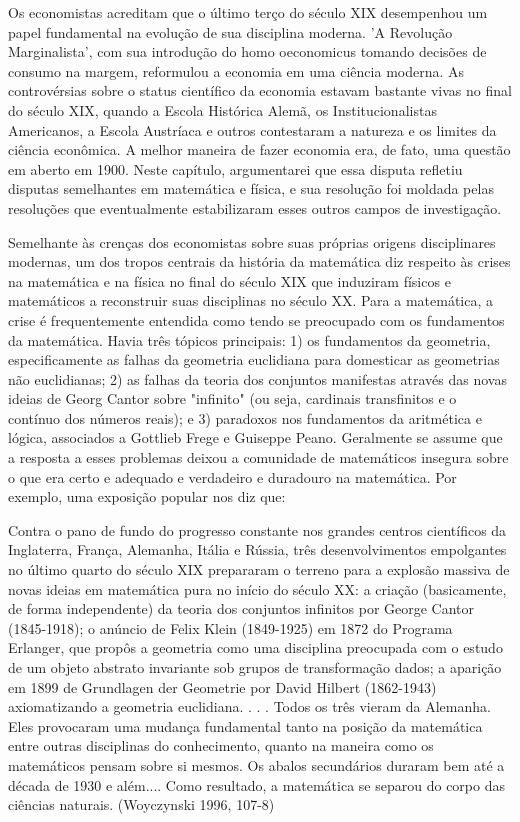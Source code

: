 \documentclass[12pt]{article}
\begin{document}
Os economistas acreditam que o último terço do século XIX desempenhou um papel fundamental na evolução de sua disciplina moderna. 'A Revolução Marginalista', com sua introdução do homo oeconomicus tomando decisões de consumo na margem, reformulou a economia em uma ciência moderna. As controvérsias sobre o status científico da economia estavam bastante vivas no final do século XIX, quando a Escola Histórica Alemã, os Institucionalistas Americanos, a Escola Austríaca e outros contestaram a natureza e os limites da ciência econômica. A melhor maneira de fazer economia era, de fato, uma questão em aberto em 1900. Neste capítulo, argumentarei que essa disputa refletiu disputas semelhantes em matemática e física, e sua resolução foi moldada pelas resoluções que eventualmente estabilizaram esses outros campos de investigação.

Semelhante às crenças dos economistas sobre suas próprias origens disciplinares modernas, um dos tropos centrais da história da matemática diz respeito às crises na matemática e na física no final do século XIX que induziram físicos e matemáticos a reconstruir suas disciplinas no século XX. Para a matemática, a crise é frequentemente entendida como tendo se preocupado com os fundamentos da matemática. Havia três tópicos principais: 1) os fundamentos da geometria, especificamente as falhas da geometria euclidiana para domesticar as geometrias não euclidianas; 2) as falhas da teoria dos conjuntos manifestas através das novas ideias de Georg Cantor sobre "infinito" (ou seja, cardinais transfinitos e o contínuo dos números reais); e 3) paradoxos nos fundamentos da aritmética e lógica, associados a Gottlieb Frege e Guiseppe Peano. Geralmente se assume que a resposta a esses problemas deixou a comunidade de matemáticos insegura sobre o que era certo e adequado e verdadeiro e duradouro na matemática. Por exemplo, uma exposição popular nos diz que:

Contra o pano de fundo do progresso constante nos grandes centros científicos da Inglaterra, França, Alemanha, Itália e Rússia, três desenvolvimentos empolgantes no último quarto do século XIX prepararam o terreno para a explosão massiva de novas ideias em matemática pura no início do século XX: a criação (basicamente, de forma independente) da teoria dos conjuntos infinitos por George Cantor (1845-1918); o anúncio de Felix Klein (1849-1925) em 1872 do Programa Erlanger, que propôs a geometria como uma disciplina preocupada com o estudo de um objeto abstrato invariante sob grupos de transformação dados; a aparição em 1899 de Grundlagen der Geometrie por David Hilbert (1862-1943) axiomatizando a geometria euclidiana. . . . Todos os três vieram da Alemanha. Eles provocaram uma mudança fundamental tanto na posição da matemática entre outras disciplinas do conhecimento, quanto na maneira como os matemáticos pensam sobre si mesmos. Os abalos secundários duraram bem até a década de 1930 e além.... Como resultado, a matemática se separou do corpo das ciências naturais. (Woyczynski 1996, 107-8)
\end{document}
